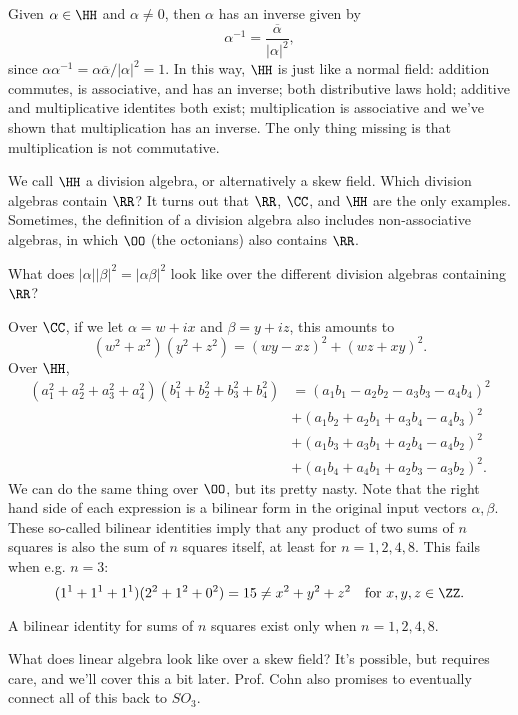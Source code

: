 Given $\alpha\in \HH$ and $\alpha\neq 0$, then $\alpha$ has an inverse given by 
\[\alpha^{-1} = \frac{\overline{\alpha}}{\vert\alpha\vert^2},\] 
since $\alpha\alpha^{-1} =\alpha\overline{\alpha}/\vert\alpha\vert^2=1$. In this way, $\HH$ is just like a normal field: addition commutes, is associative, and has an inverse; both distributive laws hold; additive and multiplicative identites both exist; multiplication is associative and we've shown that multiplication has an inverse. The only thing missing is that multiplication is not commutative. 

We call $\HH$ a \ac{division algebra}, or alternatively a \ac{skew field}. Which division algebras contain $\RR$? It turns out that $\RR$, $\CC$, and $\HH$ are the only examples. Sometimes, the definition of a division algebra also includes non-associative algebras, in which $\OO$ (the octonians) also contains $\RR$. 

\begin{example}
\exlabel

What does $\vert\alpha\vert\vert\beta\vert^2 = \vert\alpha\beta\vert^2$ look like over the different division algebras containing $\RR$?
\end{example}
\noindent Over $\CC$, if we let $\alpha = w+ix$ and $\beta = y+iz$, this amounts to
\[(w^2+x^2)(y^2+z^2) = (wy-xz)^2+(wz+xy)^2.\]
Over $\HH$, 
\begin{align*}
    (a_1^2+a_2^2+a_3^2+a_4^2)(b_1^2+b_2^2+b_3^2+b_4^2) &= (a_1b_1-a_2b_2-a_3b_3-a_4b_4)^2 \\ 
    &+ (a_1b_2+a_2b_1+a_3b_4-a_4b_3)^2 \\ 
    &+ (a_1b_3+a_3b_1+a_2b_4-a_4b_2)^2 \\ 
    &+ (a_1b_4+a_4b_1+a_2b_3-a_3b_2)^2.
\end{align*}
We can do the same thing over $\OO$, but its pretty nasty. Note that the right hand side of each expression is a bilinear form in the original input vectors $\alpha, \beta$. These so-called bilinear identities imply that any product of two sums of $n$ squares is also the sum of $n$ squares itself, at least for $n=1,2,4,8$. This fails when e.g. $n=3$:
\[(1^1+1^1+1^1)(2^2+1^2+0^2)=15 \neq x^2+y^2+z^2\quad \text{for }x,y,z\in \ZZ.\]

\begin{theorem}

A bilinear identity for sums of $n$ squares exist only when $n=1,2,4,8$.
\end{theorem}

What does linear algebra look like over a skew field? It's possible, but requires care, and we'll cover this a bit later. Prof. Cohn also promises to eventually connect all of this back to $SO_3$. 

 